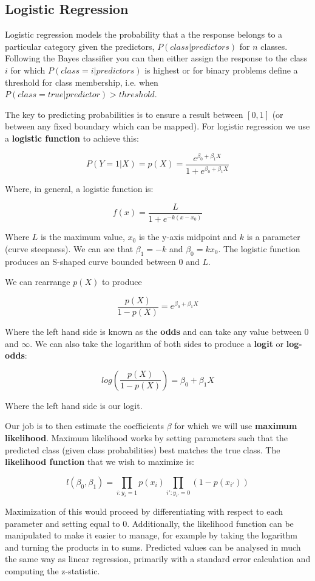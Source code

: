 \subsection{Logistic Regression}

Logistic regression models the probability that a the response belongs to a particular category given the predictors, $P(class|predictors)$ for $n$ classes. Following the Bayes classifier you can then either assign the response to the class $i$ for which $P(class=i|predictors)$ is highest or for binary problems define a threshold for class membership, i.e. when $P(class=true|predictor) > threshold$.

The key to predicting probabilities is to ensure a result between $[0,1]$ (or between any fixed boundary which can be mapped). For logistic regression we use a \textbf{logistic function} to achieve this:

$$ P(Y=1|X) = p(X) = \frac{e^{\beta_{0}+\beta_{1}X}}{1+e^{\beta_{0}+\beta_{1}X}} $$

Where, in general, a logistic function is:

$$ f(x) = \frac{L}{1+e^{-k(x-x_{0})}} $$

Where $L$ is the maximum value, $x_{0}$ is the y-axis midpoint and $k$ is a parameter (curve steepness). We can see that $\beta_{1} = -k$ and $\beta_{0} = kx_{0}$. The logistic function produces an S-shaped curve bounded between $0$ and $L$.

We can rearrange $p(X)$ to produce

$$ \frac{p(X)}{1-p(X)} = e^{\beta_{0}+\beta_{1}X} $$

Where the left hand side is known as the \textbf{odds} and can take any value between 0 and $\infty$. We can also take the logarithm of both sides to produce a \textbf{logit} or \textbf{log-odds}:

$$ log \left( \frac{p(X)}{1-p(X)} \right) = \beta_{0}+\beta_{1}X $$

Where the left hand side is our logit.

Our job is to then estimate the coefficients $\beta$ for which we will use \textbf{maximum likelihood}. Maximum likelihood works by setting parameters such that the predicted class (given class probabilities) best matches the true class. The \textbf{likelihood function} that we wish to maximize is:

$$ l(\beta_{0},\beta_{1}) = \prod_{i:y_{i} = 1} p(x_{i}) \prod_{i':y_{i'} = 0} (1 - p(x_{i'})) $$

Maximization of this would proceed by differentiating with respect to each parameter and setting equal to 0. Additionally, the likelihood function can be manipulated to make it easier to manage, for example by taking the logarithm and turning the products in to sums. Predicted values can be analysed in much the same way as linear regression, primarily with a standard error calculation and computing the z-statistic.

